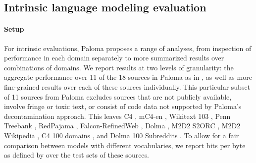 \documentclass[11pt]{article}
\newcommand{\olmo}{OLMo\xspace}
\newcommand{\model}{OLMo-7B\xspace}
\newcommand{\note}[4][]{\todo[author=#2,color=#3,fancyline,caption={}]{#4}} %
\newcommand{\hanna}[2][]{\note[#1]{\texttt{Hanna}}{red!40}{#2}}
\begin{document}


\subsection{Intrinsic language modeling evaluation} 
\paragraph{Setup}
For intrinsic evaluations, Paloma proposes a range of analyses, from inspection of performance in each domain separately to more summarized results over combinations of domains. We report results at two levels of granularity: the aggregate performance over 11 of the 18 sources in Paloma as in \cite{magnusson2023paloma}, as well as more fine-grained results over each of these sources individually. 
This particular subset of 11 sources from Paloma excludes sources that are not publicly available, involve fringe or toxic text, or consist of code data not supported by Paloma's decontamination approach. 
This leaves C4 \citep{raffel2020exploring}, mC4-en \citep{chung2023unimaxfa}, Wikitext 103 \citep{merity2016pointersm}, Penn Treebank \citep{marcusptb,nunesptb}, RedPajama \citep{together2023redpajama}, Falcon-RefinedWeb \citep{penedo2023therd}, Dolma \citep{dolma}, M2D2 S2ORC \citep{reid-etal-2022-m2d2}, M2D2 Wikipedia \citep{reid-etal-2022-m2d2}, C4 100 domains \citep{chronopoulou-etal-2022-efficient}, and Dolma 100 Subreddits \citep{dolma}. To allow for a fair comparison between models with different vocabularies, we report bits per byte as defined by \citet{gao2020pile} over the test sets of these sources.

\end{document}
